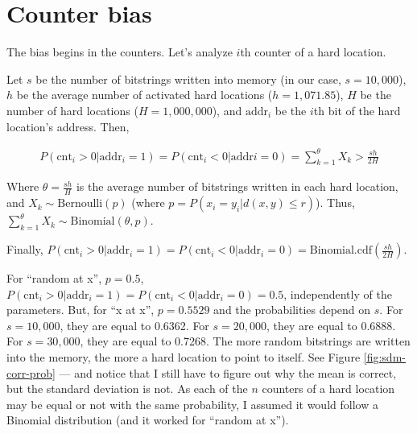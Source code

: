 \documentclass[12pt]{article}
\begin{document}








\section{Counter bias}

The bias begins in the counters. Let's analyze $i$th counter of a hard location.

Let $s$ be the number of bitstrings written into memory (in our case, $s=10,000$), $h$ be the average number of activated hard locations ($h=1,071.85$), $H$ be the number of hard locations ($H=1,000,000$), and $\text{addr}_i$ be the $i$th bit of the hard location's address. Then,

\begin{align}
P(\text{cnt}_i > 0 | \text{addr}_i = 1) = P(\text{cnt}_i < 0 | \text{addr}i = 0) = \sum_{k=1}^{\theta} X_k > \frac{sh}{2H}
\end{align}

Where $\theta = \frac{sh}{H}$ is the average number of bitstrings written in each hard location, and $X_k \sim \text{Bernoulli}(p)$ (where $p = P(x_i = y_i | d(x, y) \le r)$). Thus, $\sum_{k=1}^{\theta} X_k \sim \text{Binomial} \left( \theta, p \right)$.

Finally, $P(\text{cnt}_i > 0 | \text{addr}_i = 1) = P(\text{cnt}_i < 0 | \text{addr}_i = 0) = \text{Binomial.cdf} \left( \frac{sh}{2H} \right)$.


For ``random at x'', $p=0.5$, $P(\text{cnt}_i > 0 | \text{addr}_i = 1) = P(\text{cnt}_i < 0 | \text{addr}_i = 0) = 0.5$, independently of the parameters. But, for ``x at x'', $p=0.5529$ and the probabilities depend on $s$. For $s=10,000$, they are equal to 0.6362. For $s=20,000$, they are equal to 0.6888. For $s=30,000$, they are equal to 0.7268. The more random bitstrings are written into the memory, the more a hard location to point to itself. See Figure \ref{fig:sdm-corr-prob} --- and notice that I still have to figure out why the mean is correct, but the standard deviation is not. As each of the $n$ counters of a hard location may be equal or not with the same probability, I assumed it would follow a Binomial distribution (and it worked for ``random at x'').
\end{document}
